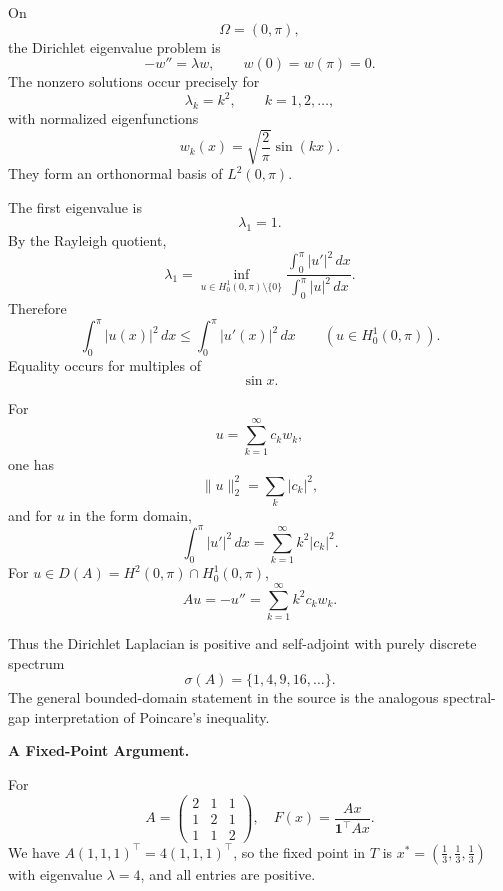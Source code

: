 \begin{solution}
On
\[
\Omega=(0,\pi),
\]
the Dirichlet eigenvalue problem is
\[
-w''=\lambda w,
\qquad
w(0)=w(\pi)=0.
\]
The nonzero solutions occur precisely for
\[
\lambda_k=k^2,
\qquad
k=1,2,\ldots,
\]
with normalized eigenfunctions
\[
\boxed{
w_k(x)
=
\sqrt{\frac2\pi}\sin(kx).
}
\]
They form an orthonormal basis of \(L^2(0,\pi)\).

The first eigenvalue is
\[
\lambda_1=1.
\]
By the Rayleigh quotient,
\[
\lambda_1
=
\inf_{u\in H_0^1(0,\pi)\setminus\{0\}}
\frac{\int_0^\pi|u'|^2\,dx}
{\int_0^\pi|u|^2\,dx}.
\]
Therefore
\[
\boxed{
\int_0^\pi|u(x)|^2\,dx
\le
\int_0^\pi|u'(x)|^2\,dx
\qquad
(u\in H_0^1(0,\pi)).
}
\]
Equality occurs for multiples of
\[
\sin x.
\]

For
\[
u=\sum_{k=1}^{\infty}c_kw_k,
\]
one has
\[
\|u\|_2^2
=
\sum_k|c_k|^2,
\]
and for \(u\) in the form domain,
\[
\boxed{
\int_0^\pi|u'|^2\,dx
=
\sum_{k=1}^{\infty}
k^2|c_k|^2.
}
\]
For \(u\in D(A)=H^2(0,\pi)\cap H_0^1(0,\pi)\),
\[
Au=-u''
=
\sum_{k=1}^{\infty}k^2c_kw_k.
\]

Thus the Dirichlet Laplacian is positive and self-adjoint with purely discrete spectrum
\[
\boxed{
\sigma(A)=\{1,4,9,16,\ldots\}.
}
\]
The general bounded-domain statement in the source is the analogous spectral-gap
interpretation of Poincare's inequality.
\end{solution}


\begin{problem}[CP-II-0112]
\label{prob:cp-ii-0112}
\textbf{A Fixed-Point Argument.}

\hspace*{1.5em}For
\[
A=
\begin{pmatrix}
	2&1&1\\
	1&2&1\\
	1&1&2
\end{pmatrix},
\quad
F(x)=\frac{Ax}{\mathbf{1}^\top Ax}.
\]
We have $A(1,1,1)^\top=4(1,1,1)^\top$, so the fixed point in $T$ is
$x^\ast=(\tfrac13,\tfrac13,\tfrac13)$ with eigenvalue $\lambda=4$, and all entries are positive.
\end{problem}

